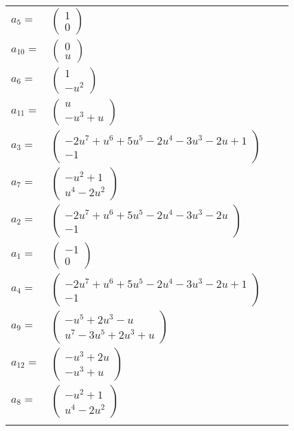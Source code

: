 \documentclass[1p]{elsarticle_modified}
\theoremstyle{definition}
\begin{document}
\begin{tabular}{m{7pt} m{180pt} m{7pt} m{180pt} }
\flushright $a_{5}=$&$\begin{pmatrix}1\\0\end{pmatrix}$ \\
\flushright $a_{10}=$&$\begin{pmatrix}0\\u\end{pmatrix}$ \\
\flushright $a_{6}=$&$\begin{pmatrix}1\\- u^2\end{pmatrix}$ \\
\flushright $a_{11}=$&$\begin{pmatrix}u\\- u^3+u\end{pmatrix}$ \\
\flushright $a_{3}=$&$\begin{pmatrix}-2 u^7+u^6+5 u^5-2 u^4-3 u^3-2 u+1\\-1\end{pmatrix}$ \\
\flushright $a_{7}=$&$\begin{pmatrix}- u^2+1\\u^4-2 u^2\end{pmatrix}$ \\
\flushright $a_{2}=$&$\begin{pmatrix}-2 u^7+u^6+5 u^5-2 u^4-3 u^3-2 u\\-1\end{pmatrix}$ \\
\flushright $a_{1}=$&$\begin{pmatrix}-1\\0\end{pmatrix}$ \\
\flushright $a_{4}=$&$\begin{pmatrix}-2 u^7+u^6+5 u^5-2 u^4-3 u^3-2 u+1\\-1\end{pmatrix}$ \\
\flushright $a_{9}=$&$\begin{pmatrix}- u^5+2 u^3- u\\u^7-3 u^5+2 u^3+u\end{pmatrix}$ \\
\flushright $a_{12}=$&$\begin{pmatrix}- u^3+2 u\\- u^3+u\end{pmatrix}$ \\
\flushright $a_{8}=$&$\begin{pmatrix}- u^2+1\\u^4-2 u^2\end{pmatrix}$\\&\end{tabular}
\end{document}
